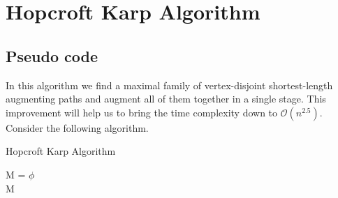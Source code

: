 \documentclass[a4paper]{report}
\theoremstyle{definition}
\begin{document}
\chapter{Hopcroft Karp Algorithm}
\section{Pseudo code}
In this algorithm we find a maximal family of vertex-disjoint shortest-length augmenting paths and augment all of them together in a single stage. This improvement will help us to
bring the time complexity down to $\mathcal{O}(n ^{2.5} )$.\\
Consider the following algorithm.
\begin{algorithm}
\caption{Hopcroft Karp Algorithm}
M = $\phi$\\
\Return M
\end{algorithm}
\end{document}
